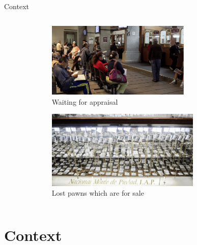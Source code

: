 \documentclass[9pt, aspectratio=169]{beamer}
\begin{document}
\begin{frame}{Context}
\begin{columns}
\begin{column}{.45\textwidth}
\begin{figure}[H]
\begin{center}
    \end{center}
    \end{figure}    
    \end{column}
\begin{column}{.45\textwidth}
\begin{figure}[H]
    \begin{center}
    \caption{Waiting for appraisal}
        \includegraphics[width=0.7\textwidth]{Figuras/empenio11_.png}
    \end{center}
    \end{figure}
\begin{figure}[H]
    \begin{center}
    \caption{Lost pawns which are for sale}
        \includegraphics[width=0.75\textwidth]{Figuras/empenio3_.png}
    \end{center}
    \end{figure}    
    \end{column}    
    \end{columns}
\end{frame}





\section{Context}
\end{document}
